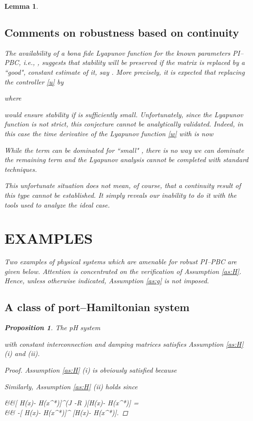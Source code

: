 \documentclass[10pt, conference]{ieeeconf}
\newtheorem{proposition}{Proposition}
\newtheorem{lemma}{Lemma}
\def\begequarrs{}
\def\lab{\label}
\begin{document}
\begin{lemma}
\subsection{Comments on robustness based on continuity}
\lab{subsec53}	
The availability of a {\em bona fide} Lyapunov function for the known parameters PI--PBC, {\em i.e.}, , suggests that stability will be preserved if the matrix  is replaced by a ``good", {\em constant} estimate of it, say . More precisely, it is expected that replacing the controller \eqref{u} by

where

would ensure stability if  is sufficiently small. Unfortunately, since the Lyapunov function is {\em not strict}, this conjecture cannot be analytically validated. Indeed, in this case the time derivative of the Lyapunov function \eqref{w} with  is now

While the term  can be dominated for ``small" , there is no way we can dominate the remaining term  and the Lyapunov analysis cannot be completed with standard techniques.

This unfortunate situation does not mean, of course, that a continuity result of this type cannot be established. It simply reveals our inability to do it with the tools used to analyze the ideal case.
\section{EXAMPLES}
\lab{sec6}	
Two examples of physical systems  which are amenable for robust PI--PBC are given below. Attention is concentrated on the verification of Assumption \ref{as:H}. Hence, unless otherwise indicated, Assumption \ref{as:g} is not imposed.
\subsection{A class of port--Hamiltonian system}
\lab{subsec61}	
\begin{proposition}
The pH system

with {\em constant} interconnection   and damping  matrices satisfies Assumption \ref{as:H} (i) and (ii).
\end{proposition}
\begin{proof}
Assumption  \ref{as:H}  (i) is obviously satisfied because

Similarly, Assumption  \ref{as:H}  (ii) holds since
\begequarrs
&&[ \nabla H(x)- \nabla H(x^*)]^\top  ({\cal J} -{\cal R} )[\nabla H(x)- \nabla H(x^*)] =\\
&& -[ \nabla H(x)- \nabla H(x^*)]^ [\nabla H(x)- \nabla H(x^*)].
\endequarrs
\end{proof}

\end{lemma}
\end{document}
